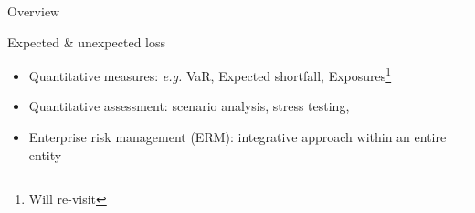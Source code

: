 \begin{frame}[allowframebreaks]{Overview}
\begin{block}{Expected \& unexpected loss}
\begin{itemize}
\item Quantitative measures: \textit{e.g.} VaR, Expected shortfall, Exposures\footnote{Will re-visit}  
\item Quantitative assessment: scenario analysis, stress testing, 
\item Enterprise risk management (ERM): integrative approach within an entire entity
\end{itemize}
\end{block}

\end{frame}